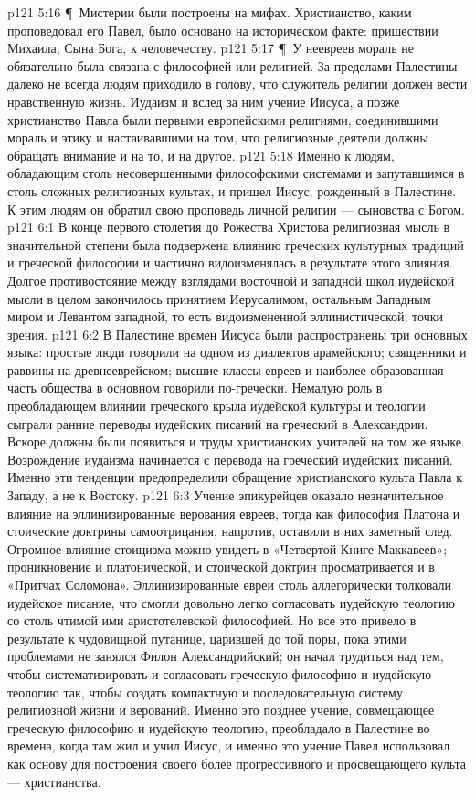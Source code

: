 \vs p121 5:16 \P\ \bibnobreakspace Мистерии были построены на мифах. Христианство, каким проповедовал его Павел, было основано на историческом факте: пришествии Михаила, Сына Бога, к человечеству.
\vs p121 5:17 \P\ У неевреев мораль не обязательно была связана с философией или религией. За пределами Палестины далеко не всегда людям приходило в голову, что служитель религии должен вести нравственную жизнь. Иудаизм и вслед за ним учение Иисуса, а позже христианство Павла были первыми европейскими религиями, соединившими мораль и этику и настаивавшими на том, что религиозные деятели должны обращать внимание и на то, и на другое.
\vs p121 5:18 Именно к людям, обладающим столь несовершенными философскими системами и запутавшимся в столь сложных религиозных культах, и пришел Иисус, рожденный в Палестине. К этим людям он обратил свою проповедь личной религии --- сыновства с Богом.
\vs p121 6:1 В конце первого столетия до Рожества Христова религиозная мысль в значительной степени была подвержена влиянию греческих культурных традиций и греческой философии и частично видоизменялась в результате этого влияния. Долгое противостояние между взглядами восточной и западной школ иудейской мысли в целом закончилось принятием Иерусалимом, остальным Западным миром и Левантом западной, то есть видоизмененной эллинистической, точки зрения.
\vs p121 6:2 В Палестине времен Иисуса были распространены три основных языка: простые люди говорили на одном из диалектов арамейского; священники и раввины на древнееврейском; высшие классы евреев и наиболее образованная часть общества в основном говорили по\hyp{}гречески. Немалую роль в преобладающем влиянии греческого крыла иудейской культуры и теологии сыграли ранние переводы иудейских писаний на греческий в Александрии. Вскоре должны были появиться и труды христианских учителей на том же языке. Возрождение иудаизма начинается с перевода на греческий иудейских писаний. Именно эти тенденции предопределили обращение христианского культа Павла к Западу, а не к Востоку.
\vs p121 6:3 Учение эпикурейцев оказало незначительное влияние на эллинизированные верования евреев, тогда как философия Платона и стоические доктрины самоотрицания, напротив, оставили в них заметный след. Огромное влияние стоицизма можно увидеть в «Четвертой Книге Маккавеев»; проникновение и платонической, и стоической доктрин просматривается и в «Притчах Соломона». Эллинизированные евреи столь аллегорически толковали иудейское писание, что смогли довольно легко согласовать иудейскую теологию со столь чтимой ими аристотелевской философией. Но все это привело в результате к чудовищной путанице, царившей до той поры, пока этими проблемами не занялся Филон Александрийский; он начал трудиться над тем, чтобы систематизировать и согласовать греческую философию и иудейскую теологию так, чтобы создать компактную и последовательную систему религиозной жизни и верований. Именно это позднее учение, совмещающее греческую философию и иудейскую теологию, преобладало в Палестине во времена, когда там жил и учил Иисус, и именно это учение Павел использовал как основу для построения своего более прогрессивного и просвещающего культа --- христианства.
